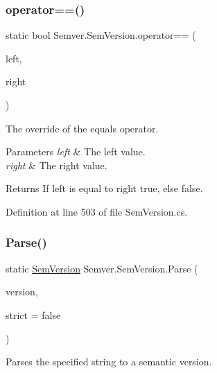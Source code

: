 \subsubsection{\texorpdfstring{operator==()}{operator==()}}
{\footnotesize\ttfamily static bool Semver.\+Sem\+Version.\+operator== (\begin{DoxyParamCaption}\item[{\mbox{\hyperlink{class_semver_1_1_sem_version}{Sem\+Version}}}]{left,  }\item[{\mbox{\hyperlink{class_semver_1_1_sem_version}{Sem\+Version}}}]{right }\end{DoxyParamCaption})\hspace{0.3cm}{\ttfamily [static]}}



The override of the equals operator. 


\begin{DoxyParams}{Parameters}
{\em left} & The left value.\\
\hline
{\em right} & The right value.\\
\hline
\end{DoxyParams}
\begin{DoxyReturn}{Returns}
If left is equal to right {\ttfamily true}, else {\ttfamily false}.
\end{DoxyReturn}


Definition at line 503 of file Sem\+Version.\+cs.

\mbox{\label{class_semver_1_1_sem_version_a3928bdf405e6d854e400d2fbd5cd0164}} 
\subsubsection{\texorpdfstring{Parse()}{Parse()}}
{\footnotesize\ttfamily static \mbox{\hyperlink{class_semver_1_1_sem_version}{Sem\+Version}} Semver.\+Sem\+Version.\+Parse (\begin{DoxyParamCaption}\item[{string}]{version,  }\item[{bool}]{strict = {\ttfamily false} }\end{DoxyParamCaption})\hspace{0.3cm}{\ttfamily [static]}}



Parses the specified string to a semantic version. 


